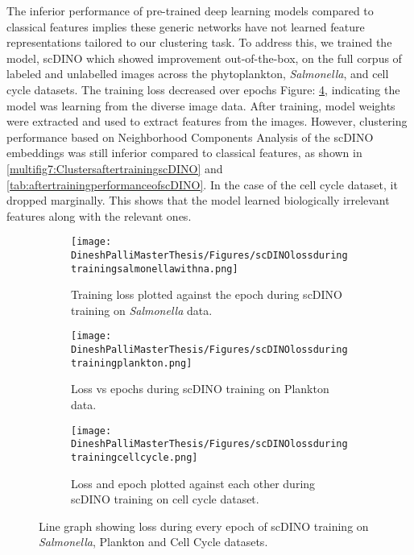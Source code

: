 \documentclass[12pt,a4paper]{article}
\begin{document}
The inferior performance of pre-trained deep learning models compared to classical features implies these generic networks have not learned feature representations tailored to our clustering task. To address this, we trained the model, scDINO which showed improvement out-of-the-box, on the full corpus of labeled and unlabelled images across the phytoplankton, \textit{Salmonella}, and cell cycle datasets. The training loss decreased over epochs Figure: \ref{trainingloss:scDINO}, indicating the model was learning from the diverse image data. After training, model weights were extracted and used to extract features from the images. However, clustering performance based on Neighborhood Components Analysis of the scDINO embeddings was still inferior compared to classical features, as shown in \ref{multifig7:ClustersaftertrainingscDINO} and \ref{tab:aftertrainingperformanceofscDINO}. In the case of the cell cycle dataset, it dropped marginally. This shows that the model learned biologically irrelevant features along with the relevant ones. %


\begin{figure}
  \centering
  \begin{subfigure}{0.5\linewidth}
    \texttt{[image: DineshPalliMasterThesis/Figures/scDINOlossduringtrainingsalmonellawithna.png]}
    \caption{Training loss plotted against the epoch during scDINO training on \textit{Salmonella} data.}
    \label{trainingloss:image_a}
  \end{subfigure}
  \hfill
  \begin{subfigure}{0.5\linewidth}
    \texttt{[image: DineshPalliMasterThesis/Figures/scDINOlossduringtrainingplankton.png]}
    \caption{Loss vs epochs during scDINO training on Plankton data.}
    \label{trainingloss:image_b}
  \end{subfigure}
  \hfill
  \begin{subfigure}{0.5\linewidth}
    \texttt{[image: DineshPalliMasterThesis/Figures/scDINOlossduringtrainingcellcycle.png]}
    \caption{Loss and epoch plotted against each other during scDINO training on cell cycle dataset.}
    \label{trainingloss:image_c}
  \end{subfigure}
  \caption[Loss during training of scDINO, on the three datasets]{Line graph showing loss during every epoch of scDINO training on \textit{Salmonella}, Plankton and Cell Cycle datasets.}
  \label{trainingloss:scDINO}
\end{figure}
\end{document}
